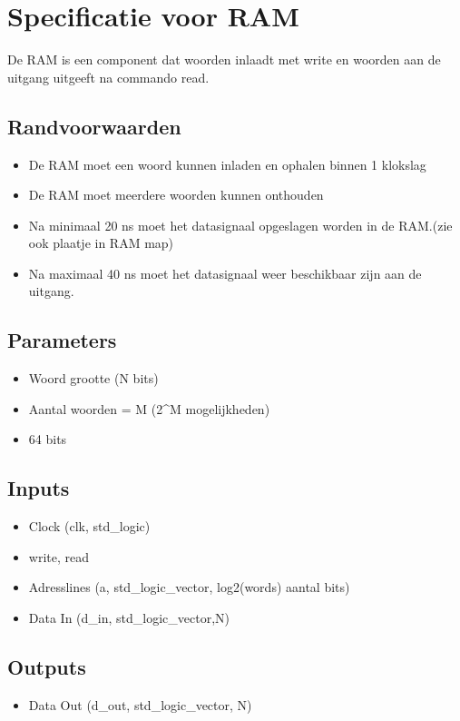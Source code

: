 \documentclass{article}
\begin{document}
\section{Specificatie voor RAM}
De RAM is een component dat woorden inlaadt met write en woorden aan de uitgang uitgeeft na commando read. 
\subsection{Randvoorwaarden}
\begin{itemize}
\item De RAM moet een woord kunnen inladen en ophalen binnen 1 klokslag
\item De RAM moet meerdere woorden kunnen onthouden
\item Na minimaal 20 ns moet het datasignaal opgeslagen worden in de RAM.(zie ook plaatje in RAM map)
\item Na maximaal 40 ns moet het datasignaal weer beschikbaar zijn aan de uitgang.
\end{itemize}
\subsection{Parameters}
\begin{itemize}
\item Woord grootte (N bits)
\item Aantal woorden = M (2^M mogelijkheden)
\item 64 bits

\end{itemize}
\subsection{Inputs}
\begin{itemize}
\item Clock (clk, std\_logic)
\item write, read
\item Adresslines (a, std\_logic\_vector, log2(words) aantal bits)
\item Data In (d\_in, std\_logic\_vector,N)
\end{itemize}
\subsection{Outputs}
\begin{itemize}
\item Data Out (d\_out, std\_logic\_vector, N)
\end{itemize}
\end{document}

